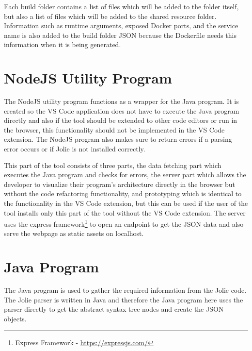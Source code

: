 Each build folder contains a list of files which will be added to the folder itself, but also a list of files which will be added to the shared resource folder.
Information such as runtime arguments, exposed Docker ports, and the service name is also added to the build folder JSON because the Dockerfile needs this information when it is being generated.

\section{NodeJS Utility Program}
The NodeJS utility program functions as a wrapper for the Java program. It is created so the VS Code application does not have to execute the Java program directly and also if the tool should be extended to other code editors or run in the browser, this functionality should not be implemented in the VS Code extension.
The NodeJS program also makes sure to return errors if a parsing error occurs or if Jolie is not installed correctly.

This part of the tool consists of three parts, the data fetching part which executes the Java program and checks for errors, the server part which allows the developer to visualize their program's architecture directly in the browser but without the code refactoring functionality, and
prototyping which is identical to the functionality in the VS Code extension, but this can be used if the user of the tool installs only this part of the tool without the VS Code extension.
The server uses the express framework\footnote{Express Framework - \url{https://expressjs.com/}} to open an endpoint to get the JSON data and also serve the webpage as static assets on localhost.

\section{Java Program}
The Java program is used to gather the required information from the Jolie code. The Jolie parser is written in Java and therefore the Java program here uses the parser directly to get the abstract syntax tree nodes and create the JSON objects.

